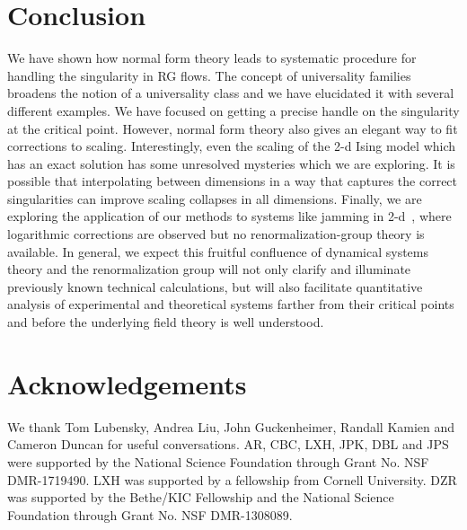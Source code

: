 \documentclass[
 reprint,
 amsmath,amssymb,
 aps, superscriptaddress, pre
]{revtex4-1}
\begin{document}
\section{Conclusion}

We have shown how normal form theory leads to systematic procedure for handling the singularity in RG flows. The concept of universality families broadens the notion of a universality class and we have elucidated it with several different examples.  We have focused on getting a precise handle on the singularity at the critical point. However, normal form theory also gives an elegant way to fit corrections to scaling. Interestingly, even the scaling of the 2-d Ising model which has an exact solution has some unresolved mysteries which we are exploring.  It is possible that interpolating between dimensions in a way that
captures the correct singularities can improve scaling collapses
in all dimensions. Finally, we are exploring the application of our methods
to systems like jamming in 2-d~\cite{goodrich2014jamming}, where logarithmic
corrections are observed but no renormalization-group theory is available.  In general, we expect this fruitful confluence of dynamical systems theory and
the renormalization group will not only clarify and illuminate previously
known technical calculations, but will also facilitate quantitative analysis
of experimental and theoretical systems farther from their critical points
and before the underlying field theory is well understood.

\section{Acknowledgements}

We thank Tom Lubensky, Andrea Liu, John Guckenheimer, Randall Kamien and Cameron Duncan for useful conversations. AR, CBC, LXH, JPK, DBL and JPS were supported by the National Science Foundation through Grant No. NSF DMR-1719490. LXH was supported by a fellowship from Cornell University. DZR was supported by the Bethe/KIC Fellowship and the National Science Foundation through Grant No. NSF DMR-1308089.
\end{document}
